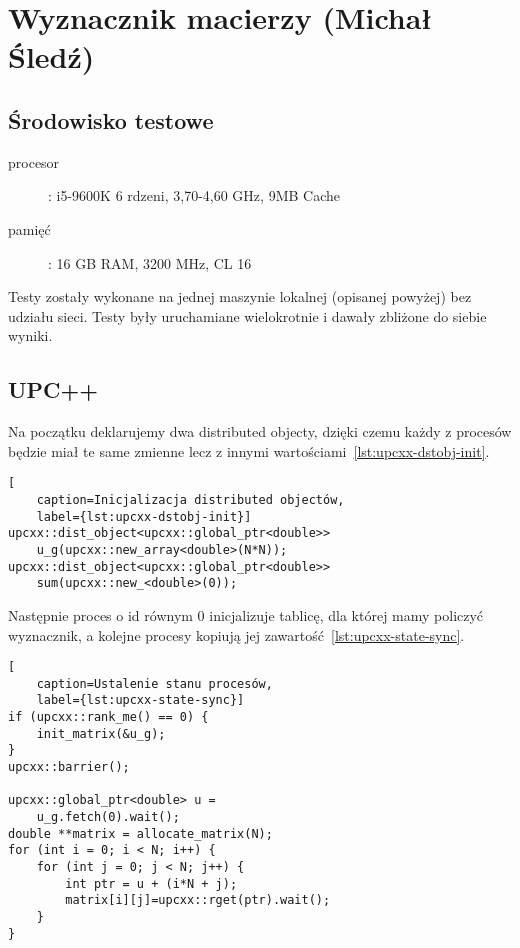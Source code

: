 \section{Wyznacznik macierzy (Michał Śledź)}
\label{sec:matrix_det}

\subsection{Środowisko testowe}

\begin{description}
    \item [procesor]: i5-9600K 6 rdzeni, 3,70-4,60 GHz, 9MB Cache
    \item [pamięć]: 16 GB RAM, 3200 MHz, CL 16
\end{description}
Testy zostały wykonane na jednej maszynie lokalnej (opisanej powyżej) bez udziału
sieci.
Testy były uruchamiane wielokrotnie i dawały zbliżone do siebie wyniki.

\subsection{UPC++}

Na początku deklarujemy dwa distributed objecty, dzięki czemu
każdy z procesów będzie miał te same zmienne lecz z innymi
wartościami~\ref{lst:upcxx-dstobj-init}.

\begin{lstlisting}[
    caption=Inicjalizacja distributed objectów,
    label={lst:upcxx-dstobj-init}]
upcxx::dist_object<upcxx::global_ptr<double>>
    u_g(upcxx::new_array<double>(N*N));
upcxx::dist_object<upcxx::global_ptr<double>>
    sum(upcxx::new_<double>(0));
\end{lstlisting}

Następnie proces o id równym 0 inicjalizuje tablicę, dla której
mamy policzyć wyznacznik, a kolejne procesy kopiują
jej zawartość~\ref{lst:upcxx-state-sync}.

\begin{lstlisting}[
    caption=Ustalenie stanu procesów,
    label={lst:upcxx-state-sync}]
if (upcxx::rank_me() == 0) {
    init_matrix(&u_g);
}
upcxx::barrier();

upcxx::global_ptr<double> u =
    u_g.fetch(0).wait();
double **matrix = allocate_matrix(N);
for (int i = 0; i < N; i++) {
    for (int j = 0; j < N; j++) {
        int ptr = u + (i*N + j);
        matrix[i][j]=upcxx::rget(ptr).wait();
    }
}
\end{lstlisting}

